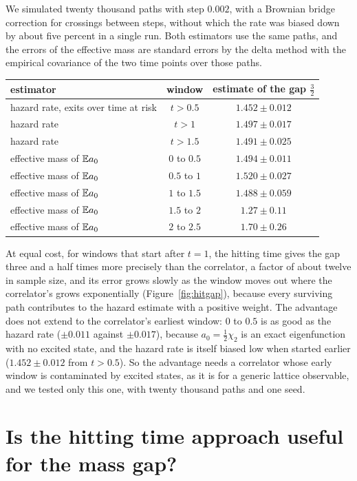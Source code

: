 We simulated twenty thousand paths with step $0.002$, with a Brownian bridge correction for crossings between steps, without which the rate was biased down by about five percent in a single run. Both estimators use the same paths, and the errors of the effective mass are standard errors by the delta method with the empirical covariance of the two time points over those paths.

\begin{center}
\small
\begin{tabular}{lcc}
\toprule
estimator & window & estimate of the gap $\frac32$ \\ \midrule
hazard rate, exits over time at risk & $t>0.5$ & $1.452\pm0.012$ \\
hazard rate & $t>1$ & $1.497\pm0.017$ \\
hazard rate & $t>1.5$ & $1.491\pm0.025$ \\
effective mass of $\mathbb{E} a_0$ & $0$ to $0.5$ & $1.494\pm0.011$ \\
effective mass of $\mathbb{E} a_0$ & $0.5$ to $1$ & $1.520\pm0.027$ \\
effective mass of $\mathbb{E} a_0$ & $1$ to $1.5$ & $1.488\pm0.059$ \\
effective mass of $\mathbb{E} a_0$ & $1.5$ to $2$ & $1.27\pm0.11$ \\
effective mass of $\mathbb{E} a_0$ & $2$ to $2.5$ & $1.70\pm0.26$ \\
\bottomrule
\end{tabular}
\end{center}

At equal cost, for windows that start after $t=1$, the hitting time gives the gap three and a half times more precisely than the correlator, a factor of about twelve in sample size, and its error grows slowly as the window moves out where the correlator's grows exponentially (Figure~\ref{fig:hitgap}), because every surviving path contributes to the hazard estimate with a positive weight. The advantage does not extend to the correlator's earliest window: $0$ to $0.5$ is as good as the hazard rate ($\pm0.011$ against $\pm0.017$), because $a_0=\frac12\chi_2$ is an exact eigenfunction with no excited state, and the hazard rate is itself biased low when started earlier ($1.452\pm0.012$ from $t>0.5$). So the advantage needs a correlator whose early window is contaminated by excited states, as it is for a generic lattice observable, and we tested only this one, with twenty thousand paths and one seed.

\section{Is the hitting time approach useful for the mass gap?}


